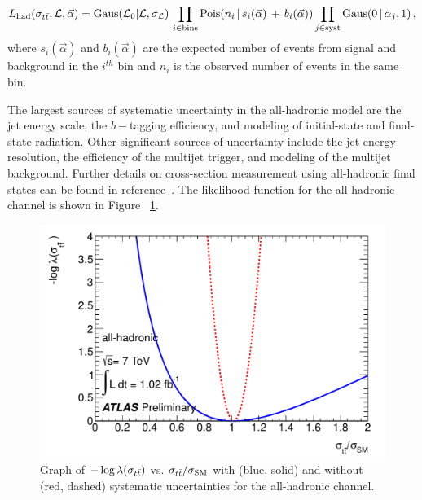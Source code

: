 \begin{equation}\label{Eq:dileplikelihood}
  L_{\text{had}}(\sigma_{t\bar{t}}, {\cal L}, \vec{\alpha }) = \text{Gaus}({\cal L}_0 | {\cal L}, \sigma_{\cal L})\, \prod_{i\in \text{bins}} \text{Pois}(n_{i} \,|\, s_{i}(\vec{\alpha}) \,+\, b_{i}(\vec{\alpha}))  \prod_{j\in \text{syst}} \text{Gaus}( 0 \,|\, \alpha_{j}, 1) \,  ,
\end{equation}
where $s_{i}(\vec{\alpha})$ and $b_{i}(\vec{\alpha})$ are the expected number of events from signal and background in the $i^{th}$ bin and $n_{i}$ is the observed number of events in the same bin. 

The largest sources of systematic uncertainty in the all-hadronic model are the jet energy scale, the $b-$tagging efficiency, and modeling of initial-state and final-state radiation.
Other significant sources of uncertainty include the jet energy resolution, the efficiency of the multijet trigger, and modeling of the multijet background.
Further details on cross-section measurement using all-hadronic final states can be found in reference~\cite{ALL_HADRONIC_NOTE}.
The likelihood function for the all-hadronic channel is shown in Figure ~\ref{fig:allhad_likelihood}.

\begin{figure}[htbp]
  \begin{center}
    \includegraphics[width=.40\textwidth]{figures/comb/allhadronic_likelihood_curve}
  \caption{Graph of $-\log\lambda(\sigma_{t\bar{t}})$ vs. $\sigma_{t\bar{t}}/\sigma_{\rm SM}$ with (blue, solid) and without (red, dashed) systematic uncertainties for the all-hadronic channel.}
  \label{fig:allhad_likelihood}
  \end{center}
\end{figure}



